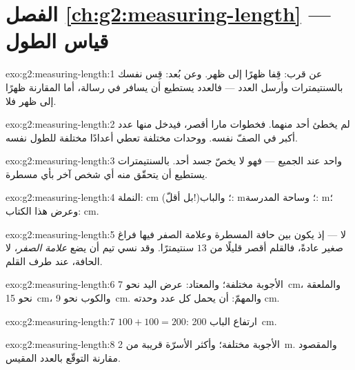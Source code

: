\section*{الفصل \ref{ch:g2:measuring-length} --- قياس الطول}

\begin{solution}{exo:g2:measuring-length:1}
عن قرب: قِفا ظهرًا إلى ظهر. وعن بُعد: قِس نفسك بالسنتيمترات
وأرسل العدد --- فالعدد يستطيع أن يسافر في رسالة، أما المقارنة
ظهرًا إلى ظهر فلا.
\end{solution}

\begin{solution}{exo:g2:measuring-length:2}
لم يخطئ أحد منهما. فخطوات مارا أقصر، فيدخل منها عدد أكبر في
الصفّ نفسه. ووحدات مختلفة تعطي أعدادًا مختلفة للطول نفسه.
\end{solution}

\begin{solution}{exo:g2:measuring-length:3}
 واحد عند الجميع --- فهو لا يخصّ جسد أحد. 
بالسنتيمترات يستطيع أن يتحقّق منه أي شخص آخر بأي مسطرة.
\end{solution}

\begin{solution}{exo:g2:measuring-length:4}
النملة: \unit{cm} (بل أقلّ!)؛ والباب: \unit{m}؛ وساحة المدرسة:
\unit{m}؛ وعرض هذا الكتاب: \unit{cm}.
\end{solution}

\begin{solution}{exo:g2:measuring-length:5}
لا --- إذ يكون بين حافة المسطرة وعلامة الصفر فيها فراغ صغير
عادةً، فالقلم أقصر قليلًا من $13$ سنتيمترًا. وقد نسي تيم أن يضع
\emph{علامة الصفر}، لا الحافة، عند طرف القلم.
\end{solution}

\begin{solution}{exo:g2:measuring-length:6}
الأجوبة مختلفة؛ والمعتاد: عرض اليد نحو \qty{7}{cm}، والملعقة نحو
\qty{15}{cm}، والكوب نحو \qty{9}{cm}. والمهمّ: أن يحمل كل عدد
وحدته \unit{cm}.
\end{solution}

\begin{solution}{exo:g2:measuring-length:7}
$100 + 100 = 200$: ارتفاع الباب \qty{200}{cm}.
\end{solution}

\begin{solution}{exo:g2:measuring-length:8}
الأجوبة مختلفة؛ وأكثر الأسرّة قريبة من \qty{2}{m}. والمقصود
مقارنة التوقّع بالعدد المقيس.
\end{solution}

